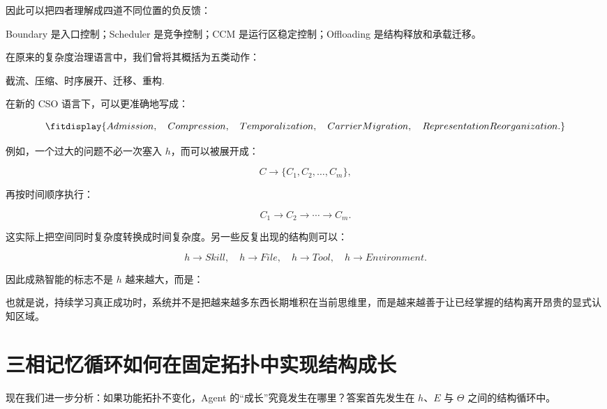 因此可以把四者理解成四道不同位置的负反馈：

\begin{statementbox}
\centering
{}
\end{statementbox}

Boundary 是入口控制；Scheduler 是竞争控制；CCM 是运行区稳定控制；Offloading 是结构释放和承载迁移。

在原来的复杂度治理语言中，我们曾将其概括为五类动作：

\begin{conclusion}
截流、压缩、时序展开、迁移、重构.
\end{conclusion}

在新的 CSO 语言下，可以更准确地写成：

\[
\fitdisplay{
Admission,
\quad
Compression,
\quad
Temporalization,
\quad
CarrierMigration,
\quad
RepresentationReorganization.
}
\]

例如，一个过大的问题不必一次塞入 $h$，而可以被展开成：

\[
C
\rightarrow
\{C_1,C_2,\ldots,C_m\},
\]

再按时间顺序执行：

\[
C_1
\rightarrow
C_2
\rightarrow
\cdots
\rightarrow
C_m.
\]

这实际上把空间同时复杂度转换成时间复杂度。另一些反复出现的结构则可以：

\[
h
\rightarrow
Skill,
\quad
h
\rightarrow
File,
\quad
h
\rightarrow
Tool,
\quad
h
\rightarrow
Environment.
\]

因此成熟智能的标志不是 $h$ 越来越大，而是：

\begin{statementbox}
\centering
{}
\end{statementbox}

也就是说，持续学习真正成功时，系统并不是把越来越多东西长期堆积在当前思维里，而是越来越善于让已经掌握的结构离开昂贵的显式认知区域。

\section{三相记忆循环如何在固定拓扑中实现结构成长}

现在我们进一步分析：如果功能拓扑不变化，Agent 的“成长”究竟发生在哪里？答案首先发生在 $h$、$E$ 与 $\Theta$ 之间的结构循环中。

